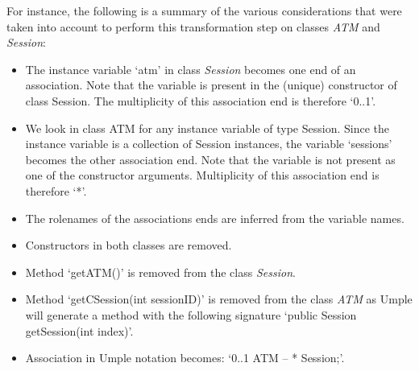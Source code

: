 For instance, the following is a summary of the various considerations that were taken into account to perform this transformation step on classes \textit{ATM} and \textit{Session}:

\begin{itemize}
\item The instance variable `atm' in class \textit{Session} becomes one end of an association. 
Note that the variable is present in the (unique) constructor of class Session. The multiplicity of this association end is therefore `0..1'.

\item We look in class ATM for any instance variable of type Session. Since the instance variable is a collection of Session instances, the variable `sessions' becomes the other association end. Note that the variable is not present as one of the constructor arguments. Multiplicity of this association end is therefore `*'.

\item The rolenames of the associations ends are inferred from the variable names.

\item Constructors in both classes are removed.

\item Method `getATM()' is removed from the class \textit{Session}.

\item Method `getCSession(int sessionID)' is removed from the class \textit{ATM} as Umple will generate a method with the following signature `public Session getSession(int index)'.

\item Association in Umple notation becomes:  `0..1 ATM --  * Session;'.
\end{itemize}

